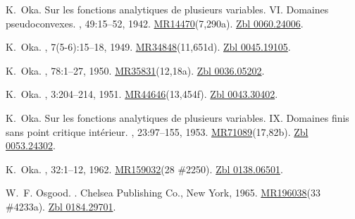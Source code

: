 \documentclass[11pt,a4paper, final, twoside]{article}
\numberwithin{equation}{section}
\begin{document}
\begin{appendices}
\begin{thebibliography}{100}
K.~Oka.
\newblock Sur les fonctions analytiques de plusieurs variables. {VI}.
  {D}omaines pseudoconvexes.
, 49:15--52, 1942.
\newblock
  \href{http://www.ams.org/mathscinet-getitem?mr=14470}{MR14470}(7,290a).
  \href{http://zbmath.org/?q=an:0060.24006}{Zbl 0060.24006}.

K.~Oka.
, 7(5-6):15--18, 1949.
\newblock
  \href{http://www.ams.org/mathscinet-getitem?mr=34848}{MR34848}(11,651d).
  \href{http://zbmath.org/?q=an:0045.19105}{Zbl 0045.19105}.

K.~Oka.
,
  78:1--27, 1950.
\newblock
  \href{http://www.ams.org/mathscinet-getitem?mr=35831}{MR35831}(12,18a).
  \href{http://zbmath.org/?q=an:0036.05202}{Zbl 0036.05202}.

K.~Oka.
, 3:204--214,
  1951.
\newblock
  \href{http://www.ams.org/mathscinet-getitem?mr=44646}{MR44646}(13,454f).
  \href{http://zbmath.org/?q=an:0043.30402}{Zbl 0043.30402}.

K.~Oka.
\newblock Sur les fonctions analytiques de plusieurs variables. {IX}.
  {D}omaines finis sans point critique int{\'e}rieur.
, 23:97--155, 1953.
\newblock
  \href{http://www.ams.org/mathscinet-getitem?mr=71089}{MR71089}(17,82b).
  \href{http://zbmath.org/?q=an:0053.24302}{Zbl 0053.24302}.

K.~Oka.
, 32:1--12, 1962.
\newblock \href{http://www.ams.org/mathscinet-getitem?mr=159032}{MR159032}(28
  \#2250). \href{http://zbmath.org/?q=an:0138.06501}{Zbl 0138.06501}.

W.~F. Osgood.
.
\newblock Chelsea Publishing Co., New York, 1965.
\newblock \href{http://www.ams.org/mathscinet-getitem?mr=196038}{MR196038}(33
  \#4233a). \href{http://zbmath.org/?q=an:0184.29701}{Zbl 0184.29701}.


\end{thebibliography}
\end{appendices}
\end{document}
